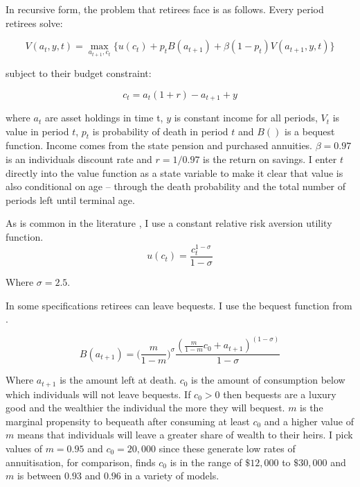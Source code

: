 \documentclass[12pt]{article}
\begin{document}
In recursive form, the problem that retirees face is as follows. Every period
retirees solve:

\begin{equation*}
    V(a_{t}, y, t) = \underset{a_{t+1}, c_{t}}{\max} \{ u(c_{t}) + p_{t}B(a_{t+1}) + \beta(1-p_{t})V(a_{t+1}, y, t) \}
\end{equation*}

subject to their budget constraint:

\begin{equation*}
    c_{t} =a_{
    t}(1 +r) -  a_{t+1} + y
\end{equation*}

where $a_{t}$ are asset holdings in time t, $y$ is constant income for all
periods, $V_{t}$ is value in period $t$, $p_{t}$ is probability of death in
period $t$ and $B()$ is a bequest function. Income comes from the state pension
and purchased annuities. $\beta = 0.97$ is an individuals discount rate and
$r = 1/0.97$ is the return on savings. I enter $t$ directly into the value
function as a state variable to make it clear that value is also conditional on
age -- through the death probability and the total number of periods left until
terminal age.

As is common in the literature \cite{lockwood_red_2012}, I use a constant relative
risk aversion utility function.
\begin{equation*}
    u(c_{t}) = \frac{c_{t}^{1 - \sigma}}{1 - \sigma}
\end{equation*}

Where $\sigma = 2.5$.

In some specifications retirees can leave bequests. I use the bequest function
from \cite{lockwood_red_2012}.

\begin{equation*}
    B(a_{t+1}) = \bigl( \frac{m}{1 - m} \bigr)^{\sigma}  \frac{(\frac{m}{1 - m}c_{0} + a_{t+1})^{(1 - \sigma)}}{1 - \sigma}
\end{equation*}

Where $a_{t+1}$ is the amount left at death. $c_{0}$ is the amount of
consumption below which individuals will not leave bequests. If $c_{0} >0$ then
bequests are a luxury good and the wealthier the individual the more they will
bequest. $m$ is the marginal propensity to bequeath after consuming at least
$c_{0}$ and a higher value of $m$ means that individuals will leave a greater
share of wealth to their heirs. I pick values of $m = 0.95$ and $c_{0} = 20,000$
since these generate low rates of annuitisation, for comparison,
\cite{lockwood_aer_2018} finds $c_{0}$ is in the range of $\$12,000$ to
$\$30,000$ and $m$ is between $0.93$ and $0.96$ in a variety of models.
\end{document}
